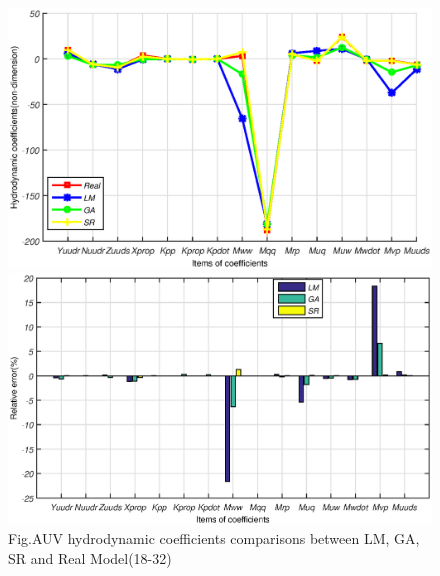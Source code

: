 \begin{figure}[!htp]
\centering
\includegraphics[width=14cm]{figure/chap3/four_18_32.eps}
\includegraphics[width=14cm]{figure/chap3/relative_error_18_32_.eps}
\label{fig:chap3:F6}
 {Fig.}{AUV hydrodynamic coefficients comparisons between LM, GA, SR and Real Model(18-32)}
\end{figure}

